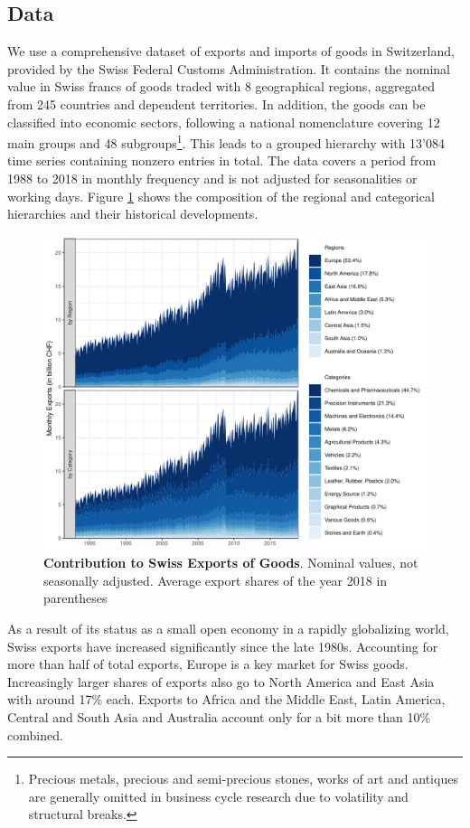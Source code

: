 \documentclass[a4paper,fleqn,11pt]{article}
\begin{document}
\subsection{Data}
We use a comprehensive dataset of exports and imports of goods in Switzerland, provided by the Swiss Federal Customs Administration. It contains the nominal value in Swiss francs of goods traded with 8 geographical regions, aggregated from 245 countries and dependent territories. In addition, the goods can be classified into economic sectors, following a national nomenclature covering 12 main groups and 48 subgroups\footnote{Precious metals, precious and semi-precious stones, works of art and antiques are generally omitted in business cycle research due to volatility and structural breaks.}. This leads to a grouped hierarchy with 13'084 time series containing nonzero entries in total. The data covers a period from 1988 to 2018 in monthly frequency and is not adjusted for seasonalities or working days. Figure \ref{fig:area} shows the composition of the regional and categorical hierarchies and their historical developments.
\begin{figure}[H]
	\includegraphics[width=\textwidth]{fig/fig_area}
	\caption[Contribution to Swiss Exports of Goods]{\textbf{Contribution to Swiss Exports of Goods}. Nominal values, not seasonally adjusted. Average export shares of the year 2018 in parentheses}\label{fig:area}
\end{figure}
As a result of its status as a small open economy in a rapidly globalizing world, Swiss exports have increased significantly since the late 1980s. Accounting for more than half of total exports, Europe is a key market for Swiss goods. Increasingly larger shares of exports also go to North America and East Asia with around 17\% each. Exports to Africa and the Middle East, Latin America, Central and South Asia and Australia account only for a bit more than 10\% combined.
\end{document}
